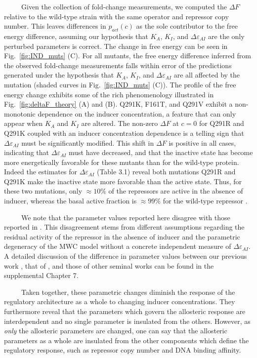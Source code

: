 \documentclass[12pt]{caltech_thesis}
\begin{document}
~~~~~Given the collection of fold-change measurements, we computed the
\(\Delta F\) relative to the wild-type strain with the same operator and
repressor copy number. This leaves differences in \(p_{act}(c)\) as the
sole contributor to the free energy difference, assuming our hypothesis
that \(K_A\), \(K_I\), and \(\Delta\varepsilon_{AI}\) are the only
perturbed parameters is correct. The change in free energy can be seen
in Fig.~\ref{fig:IND_muts} (C). For all mutants, the free energy
difference inferred from the observed fold-change measurements falls
within error of the predictions generated under the hypothesis that
\(K_A\), \(K_I\), and \(\Delta\varepsilon_{AI}\) are all affected by the
mutation (shaded curves in Fig.~\ref{fig:IND_muts} (C)). The profile of
the free energy change exhibits some of the rich phenomenology
illustrated in Fig.~\ref{fig:deltaF_theory} (A) and (B). Q291K, F161T,
and Q291V exhibit a non-monotonic dependence on the inducer
concentration, a feature that can only appear when \(K_A\) and \(K_I\)
are altered. The non-zero \(\Delta F\) at \(c=0\) for Q291R and Q291K
coupled with an inducer concentration dependence is a telling sign that
\(\Delta\varepsilon_{AI}\) must be significantly modified. This shift in
\(\Delta F\) is positive in all cases, indicating that
\(\Delta\varepsilon_{AI}\) must have decreased, and that the inactive
state has become more energetically favorable for these mutants than for
the wild-type protein. Indeed the estimates for
\(\Delta\varepsilon_{AI}\) (Table 3.1) reveal both mutations Q291R and
Q291K make the inactive state more favorable than the active state.
Thus, for these two mutations, only \(\approx 10\%\) of the repressors
are active in the absence of inducer, whereas the basal active fraction
is \(\approx 99\%\) for the wild-type repressor
\autocite{razo-mejia2018}.

~~~~~We note that the parameter values reported here disagree with those
reported in \textcite{daber2011}. This disagreement stems from different
assumptions regarding the residual activity of the repressor in the
absence of inducer and the parametric degeneracy of the MWC model
without a concrete independent measure of \(\Delta\varepsilon_{AI}\). A
detailed discussion of the difference in parameter values between our
previous work \autocite{garcia2011,razo-mejia2018}, that of
\textcite{daber2011}, and those of other seminal works can be found in
the supplemental Chapter 7.

~~~~~Taken together, these parametric changes diminish the response of
the regulatory architecture as a whole to changing inducer
concentrations. They furthermore reveal that the parameters which govern
the allosteric response are interdependent and no single parameter is
insulated from the others. However, as \emph{only} the allosteric
parameters are changed, one can say that the allosteric parameters as a
whole are insulated from the other components which define the
regulatory response, such as repressor copy number and DNA binding
affinity.
\end{document}
